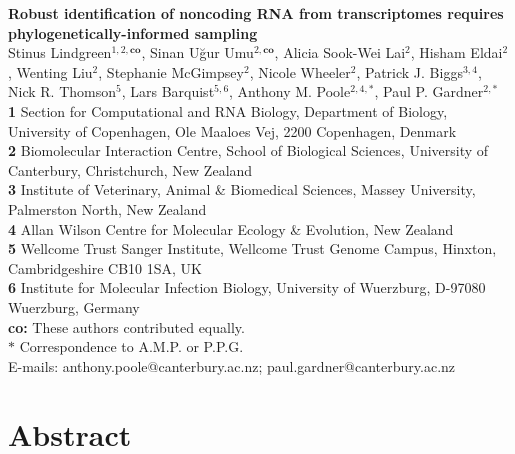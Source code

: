 \documentclass[10pt]{article}
\date{}
\begin{document}
\begin{flushleft}
{\Large
\textbf{Robust identification of noncoding RNA from transcriptomes requires phylogenetically-informed sampling}
}
\\
Stinus Lindgreen$^{1,2,\mathbf{co}}$, 
Sinan U\u{g}ur Umu$^{2,\mathbf{co}}$, 
Alicia Sook-Wei Lai$^{2}$,
Hisham Eldai$^{2}$,
Wenting Liu$^{2}$,
Stephanie McGimpsey$^{2}$,
Nicole Wheeler$^{2}$,
Patrick J. Biggs$^{3,4}$,
Nick R. Thomson$^{5}$,
Lars Barquist$^{5,6}$,
Anthony M. Poole$^{2,4,\ast}$,
Paul P. Gardner$^{2,\ast}$
\\
{\bf 1} Section for Computational and RNA Biology, Department of Biology, University of Copenhagen, Ole Maaloes Vej, 2200 Copenhagen, Denmark
\\
{\bf 2} Biomolecular Interaction Centre, School of Biological Sciences, University of Canterbury, Christchurch, New Zealand
\\
{\bf 3} Institute of Veterinary, Animal \& Biomedical Sciences, Massey University, Palmerston North, New Zealand
\\
{\bf 4} Allan Wilson Centre for Molecular Ecology \& Evolution, New Zealand
\\
{\bf 5} Wellcome Trust Sanger Institute, Wellcome Trust Genome Campus, Hinxton, Cambridgeshire CB10 1SA, UK
\\
{\bf 6} Institute for Molecular Infection Biology, University of Wuerzburg, D-97080 Wuerzburg, Germany
\\
{\bf co:} These authors contributed equally.
\\
$\ast$ Correspondence to A.M.P. or P.P.G.\\ 
E-mails: anthony.poole@canterbury.ac.nz; paul.gardner@canterbury.ac.nz
\end{flushleft}



\section*{Abstract}
\end{document}
